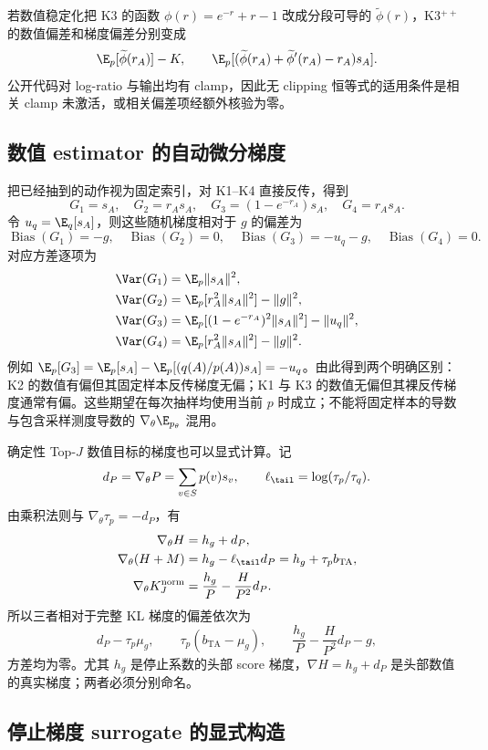 若数值稳定化把 K3 的函数 $\phi(r)=e^{-r}+r-1$ 改成分段可导的 $\widetilde\phi(r)$，K3$^{++}$ 的数值偏差和梯度偏差分别变成
\[
 \E_p[\widetilde\phi(r_A)]-K,\qquad
 \E_p[(\widetilde\phi(r_A)+\widetilde\phi'(r_A)-r_A)s_A].
\]
公开代码对 log-ratio 与输出均有 clamp，因此无 clipping 恒等式的适用条件是相关 clamp 未激活，或相关偏差项经额外核验为零。

\subsection{数值 estimator 的自动微分梯度}

把已经抽到的动作视为固定索引，对 K1--K4 直接反传，得到
\[
 G_1=s_A,\quad G_2=r_As_A,\quad
 G_3=(1-e^{-r_A})s_A,\quad G_4=r_As_A.
\]
令 $u_q=\E_q[s_A]$，则这些随机梯度相对于 $g$ 的偏差为
\[
 \operatorname{Bias}(G_1)=-g,\quad
 \operatorname{Bias}(G_2)=0,\quad
 \operatorname{Bias}(G_3)=-u_q-g,\quad
 \operatorname{Bias}(G_4)=0.
\]
对应方差逐项为
\begin{align*}
 \Var(G_1)&=\E_p\lVert s_A\rVert^2,\\
 \Var(G_2)&=\E_p[r_A^2\lVert s_A\rVert^2]-\lVert g\rVert^2,\\
 \Var(G_3)&=\E_p[(1-e^{-r_A})^2\lVert s_A\rVert^2]-\lVert u_q\rVert^2,\\
 \Var(G_4)&=\E_p[r_A^2\lVert s_A\rVert^2]-\lVert g\rVert^2.
\end{align*}
例如 $\E_p[G_3]=\E_p[s_A]-\E_p[(q(A)/p(A))s_A]=-u_q$。由此得到两个明确区别：K2 的数值有偏但其固定样本反传梯度无偏；K1 与 K3 的数值无偏但其裸反传梯度通常有偏。这些期望在每次抽样均使用当前 $p$ 时成立；不能将固定样本的导数与包含采样测度导数的 $\nabla_\theta\E_{p_\theta}$ 混用。

确定性 Top-$J$ 数值目标的梯度也可以显式计算。记
\[
 d_P=\nabla_\theta P=\sum_{v\in S}p(v)s_v,
 \qquad \ell_{\tail}=\log(\tau_p/\tau_q).
\]
由乘积法则与 $\nabla_\theta\tau_p=-d_P$，有
\begin{align*}
 \nabla_\theta H&=h_g+d_P,\\
 \nabla_\theta(H+M)&=h_g-\ell_{\tail}d_P=h_g+\tau_pb_{\mathrm{TA}},\\
 \nabla_\theta K_J^{\mathrm{norm}}
 &=\frac{h_g}{P}-\frac{H}{P^2}d_P.
\end{align*}
所以三者相对于完整 KL 梯度的偏差依次为
\[
 d_P-\tau_p\mu_g,\qquad
 \tau_p(b_{\mathrm{TA}}-\mu_g),\qquad
 \frac{h_g}{P}-\frac{H}{P^2}d_P-g,
\]
方差均为零。尤其 $h_g$ 是停止系数的头部 score 梯度，$\nabla H=h_g+d_P$ 是头部数值的真实梯度；两者必须分别命名。

\subsection{停止梯度 surrogate 的显式构造}

